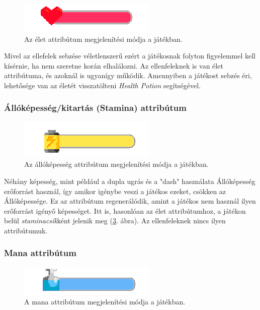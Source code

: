 \documentclass[a4paper]{article}
\begin{document}
\begin{figure}[h!]
\centering
\includegraphics[scale=0.6]{images/heart.png}
\caption{Az élet attribútum megjelenítési módja a játékban.}
\label{fig:heart}
\end{figure}

Mivel az ellefelek sebzése véletlenszerű ezért a játékosnak folyton figyelemmel kell kísérnie, ha nem szeretne korán elhalálozni.
Az ellenfeleknek is van élet attribútuma, és azoknál is ugyanígy működik.
Amennyiben a játékost sebzés éri, lehetősége van az életét visszatölteni \textit{Health Potion} segítségével.

\subsubsection{Állóképesség/kitartás (Stamina) attribútum}

\begin{figure}[h!]
\centering
\includegraphics[scale=0.6]{images/Stamina.png}
\caption{Az állóképesség attribútum megjelenítési módja a játékban.}
\label{fig:stamina}
\end{figure}

Néhány képesség, mint például a dupla ugrás és a "dash" használata Állóképesség erőforrást használ, így amikor igénybe veszi a játékos ezeket, csökken az Állóképessége.
Ez az attribútum regenerálódik, amint a játékos nem használ ilyen erőforrást igényő képességet.
Itt is, hasonlóan az élet attribútumhoz, a játékon belül \textit{staminacsík}ként jelenik meg (\ref{fig:stamina}. ábra).
Az ellenfeleknek nincs ilyen attribútumuk.

\subsubsection{Mana attribútum}

\begin{figure}[h!]
\centering
\includegraphics[scale=0.6]{images/Mana.png}
\caption{A mana attribútum megjelenítési módja a játékban.}
\label{fig:stamina}
\end{figure}
\end{document}

